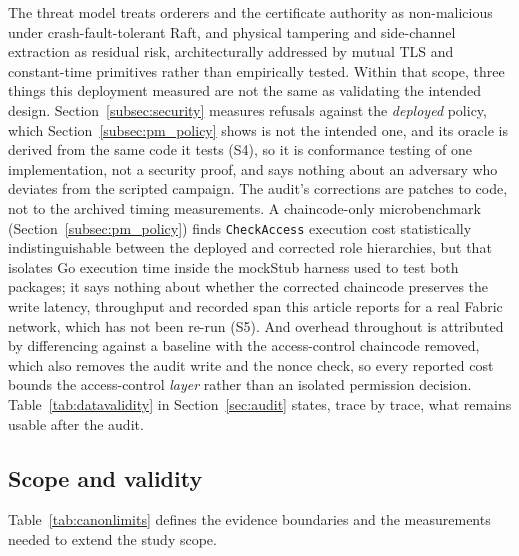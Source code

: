 \documentclass[a4paper,fleqn]{cas-sc}
\begin{document}
The threat model treats orderers and the certificate authority as
non-malicious under crash-fault-tolerant Raft, and physical tampering and
side-channel extraction as residual risk, architecturally addressed by
mutual TLS and constant-time primitives rather than empirically tested.
Within that scope, three things this deployment measured are not the same
as validating the intended design. Section~\ref{subsec:security} measures
refusals against the \emph{deployed} policy, which
Section~\ref{subsec:pm_policy} shows is not the intended one, and its
oracle is derived from the same code it tests (S4), so it is conformance
testing of one implementation, not a security proof, and says nothing
about an adversary who deviates from the scripted campaign. The
audit's corrections are patches to code, not to the archived timing
measurements. A chaincode-only microbenchmark (Section~\ref{subsec:pm_policy})
finds \texttt{CheckAccess} execution cost statistically indistinguishable
between the deployed and corrected role hierarchies, but that isolates Go
execution time inside the mockStub harness used to test both packages; it
says nothing about whether the corrected chaincode preserves the write
latency, throughput and recorded span this article reports for a real
Fabric network, which has not been re-run (S5). And overhead throughout is
attributed by differencing against a
baseline with the access-control chaincode removed, which also removes the
audit write and the nonce check, so every reported cost bounds the
access-control \emph{layer} rather than an isolated permission decision.
Table~\ref{tab:datavalidity} in Section~\ref{sec:audit} states, trace
by trace, what remains usable after the audit.

\subsection{Scope and validity}
\label{subsec:limits}
\label{subsec:threats}

Table~\ref{tab:canonlimits} defines the evidence boundaries and the
measurements needed to extend the study scope.
\end{document}
